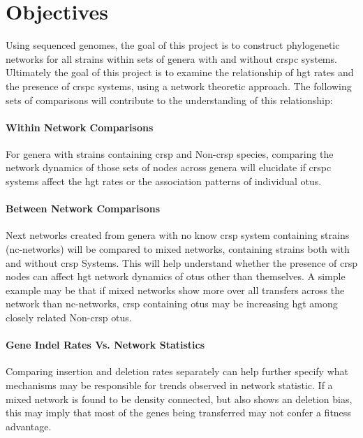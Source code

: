 \section{\huge Objectives}
Using sequenced genomes, the goal of this project is to construct phylogenetic networks for all strains within sets of genera with and without \ac{crspc} systems.
Ultimately the goal of this project is to examine the relationship of \ac{hgt} rates and the presence of \ac{crspc} systems, using a network theoretic approach. The following sets of comparisons will contribute to the understanding of this relationship:
\paragraph*{Within Network Comparisons}%
For genera with strains containing \ac{crsp} and Non-\ac{crsp} species, comparing the network dynamics of those sets of nodes across genera will elucidate if \ac{crspc} systems affect the \ac{hgt} rates or the association patterns of individual \ac{otu}s.
\paragraph*{Between Network Comparisons}%
Next networks created from genera with no know \ac{crsp} system containing strains (nc-networks) will be compared to mixed networks, containing strains both with and without \ac{crsp} Systems.
This will help understand whether the presence of \ac{crsp} nodes can affect \ac{hgt} network dynamics of \ac{otu}s other than themselves.
A simple example may be that if mixed networks show more over all transfers across the network than nc-networks, \ac{crsp} containing \ac{otu}s may be increasing \ac{hgt} among closely related Non-\ac{crsp} \ac{otu}s.
\paragraph*{Gene Indel Rates Vs. Network Statistics}%
Comparing insertion and  deletion rates separately can help further specify what mechanisms may be responsible for trends observed in network statistic.
If a mixed network is found to be density connected, but also shows an deletion bias, this may imply that most of the genes being transferred may not confer a fitness advantage.

